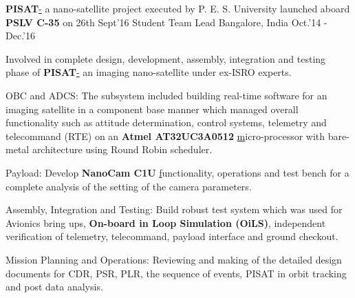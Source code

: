 \begin{cventries}
	\cventry
	{\textbf{PISAT}\href{http://pisat.pes.edu/}- a nano-satellite project executed by P. E. S. University launched aboard \textbf{PSLV C-35} on 26th Sept'16}
	{Student Team Lead}
	{Bangalore, India}
	{Oct.'14 - Dec.'16}
	{
		\begin{cvitems}
		\item{Involved in complete design, development, assembly, integration and testing phase of \textbf{PISAT}\href{https://www.isro.gov.in/Spacecraft/pisat} - an imaging nano-satellite under ex-ISRO experts.}
		\item{OBC and ADCS: The subsystem included building real-time software for an imaging satellite in a component base manner which managed overall functionality such as attitude determination, control systems, telemetry and telecommand (RTE) on an \textbf{Atmel AT32UC3A0512 }\href{https://www.microchip.com/wwwproducts/en/AT32UC3A0512} micro-processor with bare-metal architecture using Round Robin scheduler.}
		\item{Payload: Develop \textbf{NanoCam C1U }\href{https://gomspace.com/UserFiles/Subsystems/datasheet/gs-ds-nanocam-c1u-17.pdf} functionality, operations and test bench for a complete analysis of the setting of the camera parameters.}
		\item{Assembly, Integration and Testing: Build robust test system which was used for Avionics bring ups, \textbf{On-board in Loop Simulation (OiLS)}, independent verification of telemetry, telecommand, payload interface and ground checkout.}
		\item{Mission Planning and Operations: Reviewing and making of the detailed design documents for CDR, PSR, PLR, the sequence of events, PISAT in orbit tracking and post data analysis.}
		\end{cvitems}
	}
\end{cventries}
